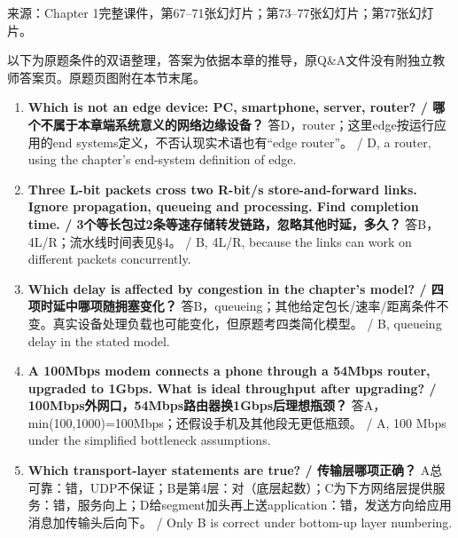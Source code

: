 来源：Chapter 1完整课件，第67–71张幻灯片；第73–77张幻灯片；第77张幻灯片。








以下为原题条件的双语整理，答案为依据本章的推导，原Q\&A文件没有附独立教师答案页。原题页图附在本节末尾。



\begin{enumerate}[start=1]

\item \textbf{Which is not an edge device: PC, smartphone, server, router? / 哪个不属于本章端系统意义的网络边缘设备？} 答D，router；这里edge按运行应用的end systems定义，不否认现实术语也有“edge router”。 / D, a router, using the chapter's end-system definition of edge.

\item \textbf{Three L-bit packets cross two R-bit/s store-and-forward links. Ignore propagation, queueing and processing. Find completion time. / 3个等长包过2条等速存储转发链路，忽略其他时延，多久？} 答B，4L/R；流水线时间表见§4。 / B, 4L/R, because the links can work on different packets concurrently.

\item \textbf{Which delay is affected by congestion in the chapter's model? / 四项时延中哪项随拥塞变化？} 答B，queueing；其他给定包长/速率/距离条件不变。真实设备处理负载也可能变化，但原题考四类简化模型。 / B, queueing delay in the stated model.

\item \textbf{A 100Mbps modem connects a phone through a 54Mbps router, upgraded to 1Gbps. What is ideal throughput after upgrading? / 100Mbps外网口，54Mbps路由器换1Gbps后理想瓶颈？} 答A，min(100,1000)=100Mbps；还假设手机及其他段无更低瓶颈。 / A, 100 Mbps under the simplified bottleneck assumptions.

\item \textbf{Which transport-layer statements are true? / 传输层哪项正确？} A总可靠：错，UDP不保证；B是第4层：对（底层起数）；C为下方网络层提供服务：错，服务向上；D给segment加头再上送application：错，发送方向给应用消息加传输头后向下。 / Only B is correct under bottom-up layer numbering.

\end{enumerate}



